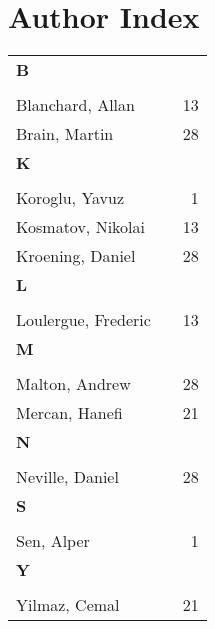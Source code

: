 \documentclass{llncs}
\begin{document}
\section*{Author Index}
\begin{longtable}{lp{10em}r}
\\
\textbf{B} \\*
\\
Blanchard, Allan & & 13 
\\
Brain, Martin & & 28 
\\
\textbf{K} \\*
\\
Koroglu, Yavuz & & 1 
\\
Kosmatov, Nikolai & & 13 
\\
Kroening, Daniel & & 28 
\\
\textbf{L} \\*
\\
Loulergue, Frederic & & 13 
\\
\textbf{M} \\*
\\
Malton, Andrew & & 28 
\\
Mercan, Hanefi & & 21 
\\
\textbf{N} \\*
\\
Neville, Daniel & & 28 
\\
\textbf{S} \\*
\\
Sen, Alper & & 1 
\\
\textbf{Y} \\*
\\
Yilmaz, Cemal & & 21 
\end{longtable}
\end{document}
